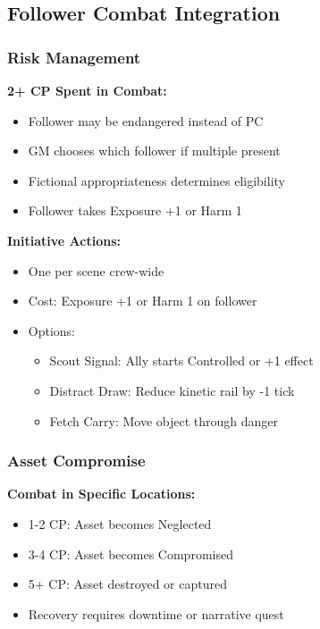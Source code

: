\documentclass[11pt,letterpaper]{article}
\begin{document}
\subsection{Follower Combat Integration}

\subsubsection{Risk Management}

\textbf{2+ CP Spent in Combat:}
\begin{itemize}[leftmargin=*]
    \item Follower may be endangered instead of PC
    \item GM chooses which follower if multiple present
    \item Fictional appropriateness determines eligibility
    \item Follower takes Exposure +1 or Harm 1
\end{itemize}

\textbf{Initiative Actions:}
\begin{itemize}[leftmargin=*]
    \item One per scene crew-wide
    \item Cost: Exposure +1 or Harm 1 on follower
    \item Options:
    \begin{itemize}
        \item Scout Signal: Ally starts Controlled or +1 effect
        \item Distract Draw: Reduce kinetic rail by -1 tick
        \item Fetch Carry: Move object through danger
    \end{itemize}
\end{itemize}

\subsubsection{Asset Compromise}

\textbf{Combat in Specific Locations:}
\begin{itemize}[leftmargin=*]
    \item 1-2 CP: Asset becomes Neglected
    \item 3-4 CP: Asset becomes Compromised
    \item 5+ CP: Asset destroyed or captured
    \item Recovery requires downtime or narrative quest
\end{itemize}
\end{document}
